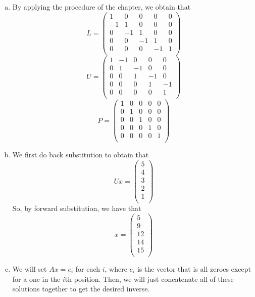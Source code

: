 \documentclass{article}
\begin{document}
\begin{enumerate}[a.]
\item
By applying the procedure of the chapter, we obtain that
\[
L = \left(\begin{array}{ccccc}
1&0&0&0&0\\
-1&1&0&0&0\\
0&-1&1&0&0\\
0&0&-1&1&0\\
0&0&0&-1&1\\
\end{array}\right)
\]
\[
U = \left(\begin{array}{ccccc}
1&-1&0&0&0\\
0&1&-1&0&0\\
0&0&1&-1&0\\
0&0&0&1&-1\\
0&0&0&0&1\\
\end{array}\right)
\]
\[
P = \left(\begin{array}{ccccc}
1&0&0&0&0\\
0&1&0&0&0\\
0&0&1&0&0\\
0&0&0&1&0\\
0&0&0&0&1\\
\end{array}\right)
\]

\item
We first do back substitution to obtain that
\[
Ux = \left(\begin{array}{c}
5\\
4\\
3\\
2\\
1\\
\end{array}\right)
\]
So, by forward substitution, we have that
\[
x = \left(\begin{array}{c}
5\\
9\\
12\\
14\\
15\\
\end{array}\right)
\]
\item
We will set $Ax = e_i$ for each $i$, where $e_i$ is the vector that is all zeroes except for a one in the $i$th position. Then, we will just concatenate all of these solutions together to get the desired inverse.


\end{enumerate}
\end{document}
